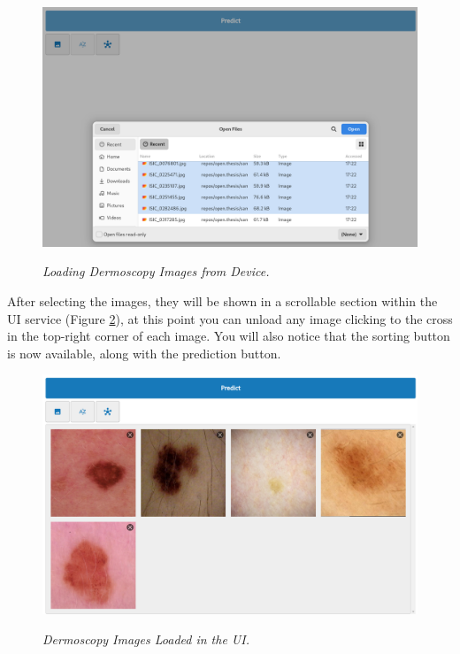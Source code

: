 \begin{figure}[H]
  \centering
  \begin{adjustbox}{width=\textwidth, trim={0.05cm 1.25cm 0cm 0.1cm}, clip}
    \includegraphics[width=\textwidth]{imatges/results/selecting-images.png}
  \end{adjustbox}
  \caption[Loading Dermoscopy Images from Device]{\textit{Loading Dermoscopy Images from Device. }}
  {\label{fig:selecting-imgs}}
\end{figure}

After selecting the images, they will be shown in a scrollable section within
the UI service (Figure \ref{fig:loaded-images}), at this point you can
unload any image clicking to the cross in the top-right corner of each image.
You will also notice that the sorting button is now available, along with the
prediction button.

\begin{figure}[H]
  \centering
  \begin{adjustbox}{width=\textwidth, trim={0cm 3.5cm 0cm 0cm}, clip}
    \includegraphics[width=\textwidth]{imatges/results/loaded-images.png}
  \end{adjustbox}
  \caption[Dermoscopy Images Loaded in the UI]{\textit{Dermoscopy Images Loaded in the UI. }}
  {\label{fig:loaded-images}}
\end{figure}

